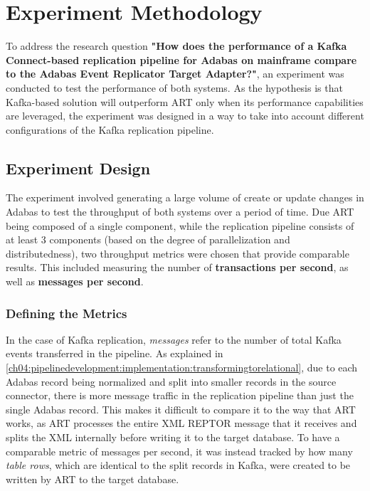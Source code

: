 \chapter{Experiment Methodology}
\label{ch05:methodology}
To address the research question \textbf{"How does the performance of a Kafka Connect-based replication pipeline for Adabas on mainframe compare to the Adabas Event Replicator Target Adapter?"}, an experiment was conducted to test the performance of both systems. As the hypothesis is that Kafka-based solution will outperform \ac{ART} only when its performance capabilities are leveraged, the experiment was designed in a way to take into account different configurations of the Kafka replication pipeline.

\section{Experiment Design}
\label{ch05:methodology:design}
The experiment involved generating a large volume of create or update changes in Adabas to test the throughput of both systems over a period of time. Due \ac{ART} being composed of a single component, while the replication pipeline consists of at least 3 components (based on the degree of parallelization and distributedness), two throughput metrics were chosen that provide comparable results. This included measuring the number of \textbf{transactions per second}, as well as \textbf{messages per second}.

\subsection{Defining the Metrics}
In the case of Kafka replication, \textit{messages} refer to the number of total Kafka events transferred in the pipeline. As explained in \ref{ch04:pipelinedevelopment:implementation:transformingtorelational}, due to each Adabas record being normalized and split into smaller records in the source connector, there is more message traffic in the replication pipeline than just the single Adabas record. This makes it difficult to compare it to the way that \ac{ART} works, as \ac{ART} processes the entire XML \ac{REPTOR} message that it receives and splits the XML internally before writing it to the target database. To have a comparable metric of messages per second, it was instead tracked by how many \textit{table rows}, which are identical to the split records in Kafka, were created to be written by \ac{ART} to the target database.

